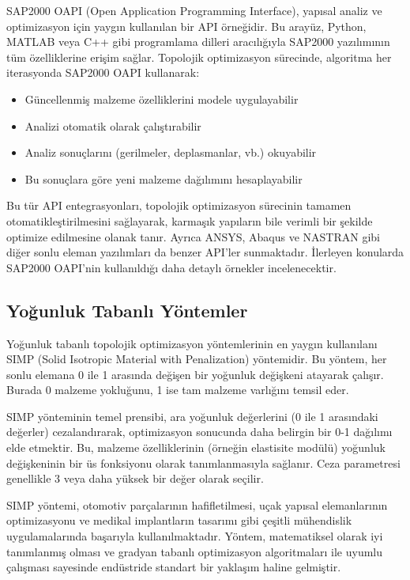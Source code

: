 SAP2000 OAPI (Open Application Programming Interface), yapısal analiz ve optimizasyon için yaygın kullanılan bir API örneğidir. Bu arayüz, Python, MATLAB veya C++ gibi programlama dilleri aracılığıyla SAP2000 yazılımının tüm özelliklerine erişim sağlar. Topolojik optimizasyon sürecinde, algoritma her iterasyonda SAP2000 OAPI kullanarak:

\begin{itemize}
    \item Güncellenmiş malzeme özelliklerini modele uygulayabilir
    \item Analizi otomatik olarak çalıştırabilir
    \item Analiz sonuçlarını (gerilmeler, deplasmanlar, vb.) okuyabilir
    \item Bu sonuçlara göre yeni malzeme dağılımını hesaplayabilir
\end{itemize}

Bu tür API entegrasyonları, topolojik optimizasyon sürecinin tamamen otomatikleştirilmesini sağlayarak, karmaşık yapıların bile verimli bir şekilde optimize edilmesine olanak tanır. Ayrıca ANSYS, Abaqus ve NASTRAN gibi diğer sonlu eleman yazılımları da benzer API'ler sunmaktadır. İlerleyen konularda SAP2000 OAPI'nin kullanıldığı daha detaylı örnekler incelenecektir.

\subsection{Yoğunluk Tabanlı Yöntemler}
Yoğunluk tabanlı topolojik optimizasyon yöntemlerinin en yaygın kullanılanı SIMP (Solid Isotropic Material with Penalization) yöntemidir. Bu yöntem, her sonlu elemana 0 ile 1 arasında değişen bir yoğunluk değişkeni atayarak çalışır. Burada 0 malzeme yokluğunu, 1 ise tam malzeme varlığını temsil eder.

SIMP yönteminin temel prensibi, ara yoğunluk değerlerini (0 ile 1 arasındaki değerler) cezalandırarak, optimizasyon sonucunda daha belirgin bir 0-1 dağılımı elde etmektir. Bu, malzeme özelliklerinin (örneğin elastisite modülü) yoğunluk değişkeninin bir üs fonksiyonu olarak tanımlanmasıyla sağlanır. Ceza parametresi genellikle 3 veya daha yüksek bir değer olarak seçilir.

SIMP yöntemi, otomotiv parçalarının hafifletilmesi, uçak yapısal elemanlarının optimizasyonu ve medikal implantların tasarımı gibi çeşitli mühendislik uygulamalarında başarıyla kullanılmaktadır. Yöntem, matematiksel olarak iyi tanımlanmış olması ve gradyan tabanlı optimizasyon algoritmaları ile uyumlu çalışması sayesinde endüstride standart bir yaklaşım haline gelmiştir.

